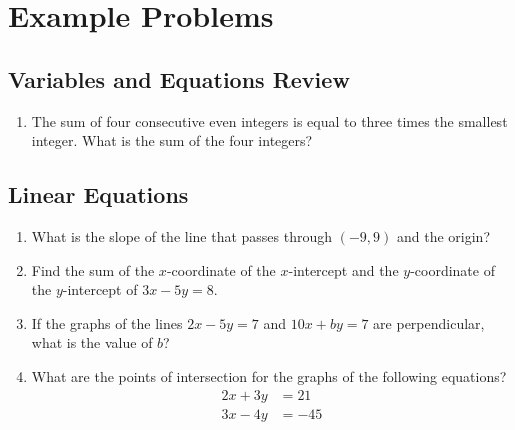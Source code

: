 \documentclass{article}
\begin{document}
    \section*{Example Problems}
    \subsection*{Variables and Equations Review}
    \begin{enumerate}
        \item The sum of four consecutive even integers is equal to three times the smallest integer. What is the sum of the four integers?
        \vspace{3cm}
    \end{enumerate}
    \subsection*{Linear Equations}
    \begin{enumerate}[resume]
        \item What is the slope of the line that passes through $(-9, 9)$ and the origin?
        \vspace{3cm}
        \item Find the sum of the $x$-coordinate of the $x$-intercept and the $y$-coordinate of the $y$-intercept of $3x - 5y = 8$.
        \vspace{3cm}
        \item If the graphs of the lines $2x - 5y = 7$ and $10x + by = 7$ are perpendicular, what is the value of $b$?
        \vspace{3cm}
        \item What are the points of intersection for the graphs of the following equations?
        \begin{align*}
            2x + 3y & = 21 \\
            3x - 4y & = -45
        \end{align*}
        \vspace{3cm}
    \end{enumerate}
\end{document}

